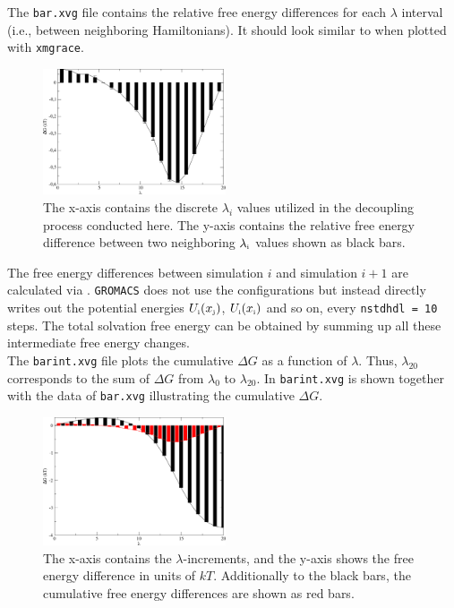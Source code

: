 \documentclass[9pt,tutorial]{livecoms}
\newcommand{\code}[1]{\colorbox{light-gray}{\texttt{#1}}}
\begin{document}
The \code{bar.xvg} file contains the relative free energy differences for each $\lambda$ interval (i.e., between neighboring Hamiltonians). It should look similar to  when plotted with \texttt{xmgrace}.
\begin{figure}[H]
    \centering
    \includegraphics[width=0.48\textwidth]{figures/bar_xvg.pdf}
    \caption[Bar Plot of the Relative Free Energy Differences.]{The x-axis contains the discrete $\lambda_i$ values utilized in the decoupling process conducted here. The y-axis contains the relative free energy difference between two neighboring $\lambda_\text{\tiny i}$ values shown as black bars.}
    \label{fig:barxvg}
\end{figure}
The free energy differences between simulation $i$ and simulation $i+1$ are calculated via . \texttt{GROMACS} does not use the configurations but instead directly writes out the potential energies $U_\text{\tiny i}(x_\text{\tiny j})$, $U_\text{\tiny i}(x_\text{\tiny i})$ and so on, every \texttt{nstdhdl = 10} steps. The total solvation free energy can be obtained by summing up all these intermediate free energy changes.\\
The \code{barint.xvg} file plots the cumulative $\Delta G$ as a function of $\lambda$. Thus, $\lambda_{20}$ corresponds to the sum of $\Delta G$ from $\lambda_0$ to $\lambda_{20}$. In  \code{barint.xvg} is shown together with the data of \code{bar.xvg} illustrating the cumulative $\Delta G$.
\begin{figure}[H]
    \centering
    \includegraphics[width=0.48\textwidth]{figures/bar_and_barint_xvg.pdf}
    \caption[Cumulative Bar Plot of the Free Energy.]{The x-axis contains the $\lambda$-increments, and the y-axis shows the free energy difference in units of $kT$. Additionally to the black bars, the cumulative free energy differences are shown as red bars.}
    \label{fig:barintxvg}
\end{figure}
\end{document}
